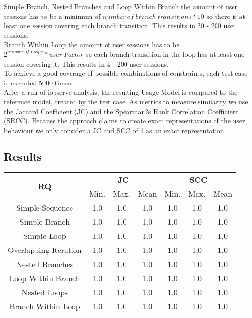 \documentclass[10pt,a4paper]{article}
\begin{document}
	Simple Branch, Nested Branches and Loop Within Branch the amount of user sessions has to be a minimum of $number\ of\ branch\ transitions * 10$ so there is at least one session covering each branch transition. This results in 20 - 200 user sessions.\\
	Branch Within Loop the amount of user sessions has to be $2^{number\ of\ Loops} * user\ Factor$ so each branch transition in the loop has at least one session covering it. This results in 4 - 200 user sessions.\\
	To achieve a good coverage of possible combinations of constraints, each test case is executed 5000 times.\\
	After a run of iobserve-analysis, the resulting Usage Model is compared to the reference model, created by the test case. As metrics to measure similarity we use the Jaccard Coefficient (JC) and the Spearman?s Rank Correlation Coefficient (SRCC). Because the approach claims to create exact representations of the user behaviour we only consider a JC and SCC of 1 as an exact representation.
	\subsection{Results}
	\begin{table}[H]
		\centering
		\begin{tabular}{|c||c|c|c||c|c|c|}
			\hline
			\multirow{2}{*}{\textbf{RQ}}
			 & \multicolumn{3}{c||}{\textbf{JC}} & \multicolumn{3}{c|}{\textbf{SCC}} \\
			 \cline{2-7}
			 & Min. & Max. & Mean & Min. & Max. & Mean \\
			\hhline{|=======|}
			Simple Sequence & 1.0 & 1.0 & 1.0 & 1.0 & 1.0 & 1.0 \\
			\hline
			Simple Branch & 1.0 & 1.0 & 1.0 & 1.0 & 1.0 & 1.0 \\
			\hline
			Simple Loop & 1.0 & 1.0 & 1.0 & 1.0 & 1.0 & 1.0 \\
			\hline
			Overlapping Iteration & 1.0 & 1.0 & 1.0 & 1.0 & 1.0 & 1.0 \\
			\hline
			Nested Branches & 1.0 & 1.0 & 1.0 & 1.0 & 1.0 & 1.0 \\
			\hline
			Loop Within Branch & 1.0 & 1.0 & 1.0 & 1.0 & 1.0 & 1.0 \\
			\hline
			Nested Loops & 1.0 & 1.0 & 1.0 & 1.0 & 1.0 & 1.0 \\
			\hline
			Branch Within Loop & 1.0 & 1.0 & 1.0 & 1.0 & 1.0 & 1.0 \\
			\hline
		\end{tabular}
	\end{table}
\end{document}
